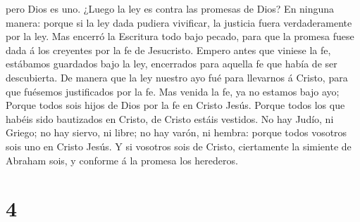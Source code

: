 pero Dios es uno.  ¿Luego la ley es contra las promesas
de Dios? En ninguna manera: porque si la ley dada pudiera vivificar, la
justicia fuera verdaderamente por la ley.  Mas encerró la
Escritura todo bajo pecado, para que la promesa fuese dada á los
creyentes por la fe de Jesucristo.  Empero antes que
viniese la fe, estábamos guardados bajo la ley, encerrados para aquella
fe que había de ser descubierta.  De manera que la ley
nuestro ayo fué para llevarnos á Cristo, para que fuésemos justificados
por la fe.  Mas venida la fe, ya no estamos bajo ayo;
 Porque todos sois hijos de Dios por la fe en Cristo
Jesús.  Porque todos los que habéis sido bautizados en
Cristo, de Cristo estáis vestidos.  No hay Judío, ni
Griego; no hay siervo, ni libre; no hay varón, ni hembra: porque todos
vosotros sois uno en Cristo Jesús.  Y si vosotros sois de
Cristo, ciertamente la simiente de Abraham sois, y conforme á la promesa
los herederos.

\hypertarget{section-3}{%
\section{4}\label{section-3}}

